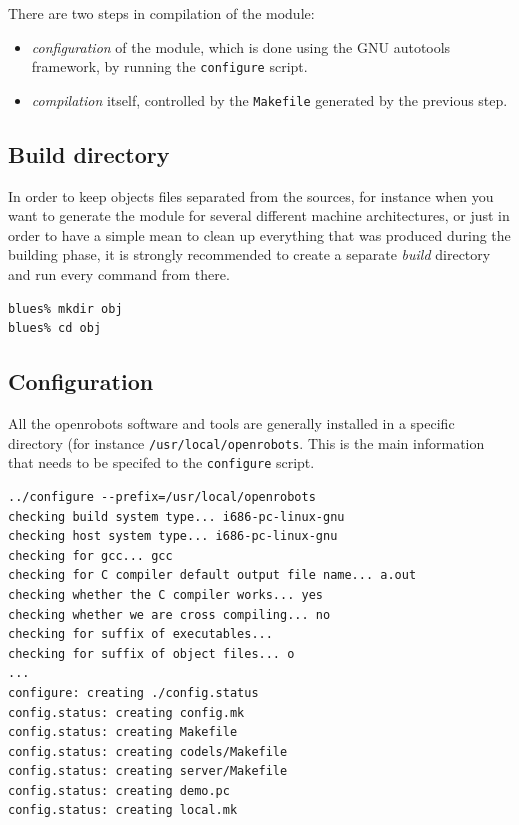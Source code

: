 There are two steps in compilation of the module:
\begin{itemize}
\item \emph{configuration} of the module, which is done using the GNU
autotools framework, by running the \texttt{configure} script.
\item \emph{compilation} itself, controlled by the \texttt{Makefile}
generated by the previous step. 
\end{itemize}

\subsection{Build directory}
In order to keep objects files separated from the sources, for
instance when you want to generate the module for several different
machine architectures, or just in order to have a simple mean to clean
up everything that was produced during the building phase, it is
strongly recommended to create a separate \emph{build} directory and
run every command from there. 

\begin{center}
\begin{cartouche}\small
\begin{verbatim}
blues% mkdir obj
blues% cd obj
\end{verbatim}
\end{cartouche}
\end{center}

\subsection{Configuration}

All the openrobots software and tools are generally installed in a specific
directory (for instance \texttt{/usr/local/openrobots}. This is the
main information that needs to be specifed to the \texttt{configure}
script. 

\begin{center}
\begin{cartouche}\small
\begin{verbatim}
../configure --prefix=/usr/local/openrobots
checking build system type... i686-pc-linux-gnu
checking host system type... i686-pc-linux-gnu
checking for gcc... gcc
checking for C compiler default output file name... a.out
checking whether the C compiler works... yes
checking whether we are cross compiling... no
checking for suffix of executables... 
checking for suffix of object files... o
...
configure: creating ./config.status
config.status: creating config.mk
config.status: creating Makefile
config.status: creating codels/Makefile
config.status: creating server/Makefile
config.status: creating demo.pc
config.status: creating local.mk
\end{verbatim}
\end{cartouche}
\end{center}

